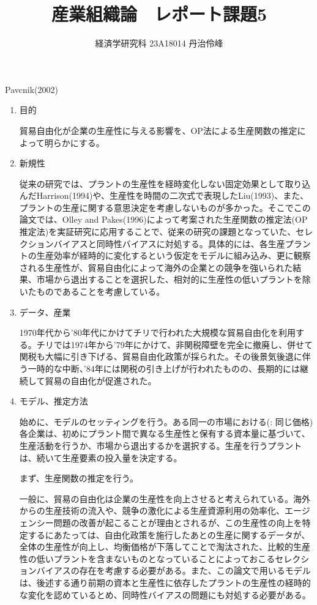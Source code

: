 \documentclass{jsarticle}
\begin{document}
\title{産業組織論　レポート課題5}
\author{経済学研究科 23A18014 丹治伶峰}
\date{}
\maketitle

Pavcnik(2002)

\begin{enumerate}

\item 目的

貿易自由化が企業の生産性に与える影響を、OP法による生産関数の推定によって明らかにする。

\item 新規性

従来の研究では、プラントの生産性を経時変化しない固定効果として取り込んだHarrison(1994)や、生産性を時間の二次式で表現したLiu(1993)、また、プラントの生産に関する意思決定を考慮しないものが多かった。そこでこの論文では、Olley and Pakes(1996)によって考案された生産関数の推定法(OP推定法)を実証研究に応用することで、従来の研究の課題となっていた、セレクションバイアスと同時性バイアスに対処する。具体的には、各生産プラントの生産効率が経時的に変化するという仮定をモデルに組み込み、更に観察される生産性が、貿易自由化によって海外の企業との競争を強いられた結果、市場から退出することを選択した、相対的に生産性の低いプラントを除いたものであることを考慮している。

\item データ、産業

1970年代から'80年代にかけてチリで行われた大規模な貿易自由化を利用する。チリでは1974年から'79年にかけて、非関税障壁を完全に撤廃し、併せて関税も大幅に引き下げる、貿易自由化政策が採られた。その後景気後退に伴う一時的な中断、'84年には関税の引き上げが行われたものの、長期的には継続して貿易の自由化が促進された。

\item モデル、推定方法

始めに、モデルのセッティングを行う。ある同一の市場における(: 同じ価格)各企業は、初めにプラント間で異なる生産性と保有する資本量に基づいて、生産活動を行うか、市場から退出するかを選択する。生産を行うプラントは、続いて生産要素の投入量を決定する。

まず、生産関数の推定を行う。

一般に、貿易の自由化は企業の生産性を向上させると考えられている。海外からの生産技術の流入や、競争の激化による生産資源利用の効率化、エージェンシー問題の改善が起こることが理由とされるが、この生産性の向上を特定するにあたっては、自由化政策を施行したあとの生産に関するデータが、全体の生産性が向上し、均衡価格が下落してことで淘汰された、比較的生産性の低いプラントを含まないものとなっていることによっておこるセレクションバイアスの存在を考慮する必要がある。また、この論文で用いるモデルは、後述する通り前期の資本と生産性に依存したプラントの生産性の経時的な変化を認めているとめ、同時性バイアスの問題にも対処する必要がある。


\end{enumerate}
\end{document}
